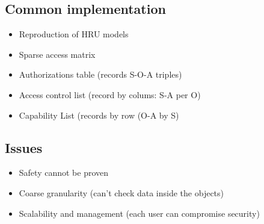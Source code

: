 \documentclass{article}
\begin{document}
\subsection{Common implementation}
\begin{itemize}
\item Reproduction of HRU models
\item Sparse access matrix
\item Authorizations table (records S-O-A triples)
\item Access control list (record by colums: S-A per O)
\item Capability List (records by row (O-A by S)
\end{itemize}
\subsection{Issues}
\begin{itemize}
\item Safety cannot be proven
\item Coarse granularity (can't check data inside the objects)
\item Scalability and management (each user can compromise security)
\end{itemize}
\end{document}
